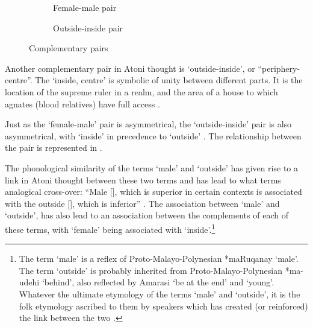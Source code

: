 \begin{figure}
  \begin{subfigure}[b]{0.49\textwidth}
		\caption{Female-male pair}\label{fig:FemMasRel}
  \end{subfigure}
  \begin{subfigure}[b]{0.49\textwidth}
		\caption{Outside-inside pair}\label{fig:OutIns}
  \end{subfigure}
	\caption{Complementary pairs}\label{fig:CompPai}
\end{figure}

Another complementary pair in Atoni thought
is  `outside-inside', or ``periphery-centre''.
The  `inside, centre' is symbolic of unity between different parts.
It is the location of the supreme ruler in a realm,
and the area of a house to which agnates
(blood relatives) have full access \citep{cu64}.

Just as the  `female-male' pair is asymmetrical,
the  `outside-inside' pair is also asymmetrical,
with  `inside' in precedence to
 `outside' \citep{cu64,scno71,fo89}.
The relationship between the pair 
is represented in .

The phonological similarity of the terms  `male'
and  `outside' has given rise to a link in Atoni thought
between these two terms and has lead to what \cite{fo89} terms analogical cross-over:
``Male [], which is superior in certain contexts
is associated with the outside [], which is inferior'' \cite[49]{fo89}.
The association between  `male' and  `outside',
has also lead to an association between the complements of each of these terms,
with  `female' being associated with  `inside'.\footnote{
		The term  `male' is a reflex of Proto-Malayo-Polynesian *maRuqanay `male'.
		The term  `outside' is probably
		inherited from Proto-Malayo-Polynesian *ma-udehi `behind',
		also reflected by Amarasi  `be at the end' and  `young'.
		Whatever the ultimate etymology of the terms  `male' and  `outside',
		it is the folk etymology ascribed to them by speakers
		which has created (or reinforced) the link between the two \citep[49]{fo89}.}

